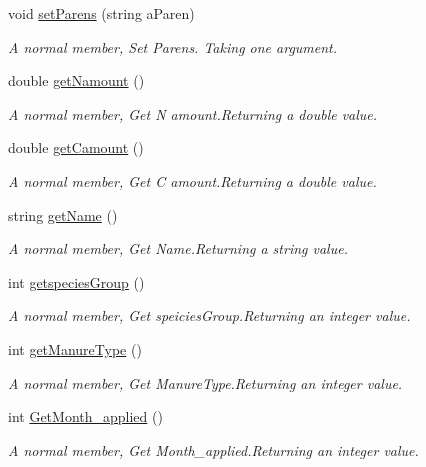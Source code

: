 \begin{DoxyCompactItemize}
void \mbox{\hyperlink{classfert_record_a483b96d7e9e7255592c19e431753802d}{set\+Parens}} (string a\+Paren)
\begin{DoxyCompactList}\small\item\em A normal member, Set Parens. Taking one argument. \end{DoxyCompactList}\item 
double \mbox{\hyperlink{classfert_record_a6bc947989cbf5d092b1428af9870205e}{get\+Namount}} ()
\begin{DoxyCompactList}\small\item\em A normal member, Get N amount.\+Returning a double value. \end{DoxyCompactList}\item 
double \mbox{\hyperlink{classfert_record_a21f44353a6a878ec133439ecd292ced0}{get\+Camount}} ()
\begin{DoxyCompactList}\small\item\em A normal member, Get C amount.\+Returning a double value. \end{DoxyCompactList}\item 
string \mbox{\hyperlink{classfert_record_abcaf5c084be3ff3a3f60bce067c3a4cc}{get\+Name}} ()
\begin{DoxyCompactList}\small\item\em A normal member, Get Name.\+Returning a string value. \end{DoxyCompactList}\item 
int \mbox{\hyperlink{classfert_record_a50f47d7b4c2dc0d6349e34b1acb4ffad}{getspecies\+Group}} ()
\begin{DoxyCompactList}\small\item\em A normal member, Get speicies\+Group.\+Returning an integer value. \end{DoxyCompactList}\item 
int \mbox{\hyperlink{classfert_record_ab027ab1cd0e3579155e2457a1ba14e85}{get\+Manure\+Type}} ()
\begin{DoxyCompactList}\small\item\em A normal member, Get Manure\+Type.\+Returning an integer value. \end{DoxyCompactList}\item 
int \mbox{\hyperlink{classfert_record_a8d0d7390de337843d5ae1f37d73013d2}{Get\+Month\+\_\+applied}} ()
\begin{DoxyCompactList}\small\item\em A normal member, Get Month\+\_\+applied.\+Returning an integer value. \end{DoxyCompactList}\item 

\end{DoxyCompactItemize}
